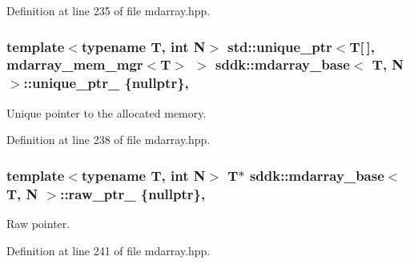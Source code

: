 Definition at line 235 of file mdarray.\+hpp.

\hypertarget{classsddk_1_1mdarray__base_aae4804447519c63f7c1c72d855744dc9}{}
\subsubsection[{unique\+\_\+ptr\+\_\+}]{\setlength{\rightskip}{0pt plus 5cm}template$<$typename T, int N$>$ std\+::unique\+\_\+ptr$<$T\mbox{[}$\,$\mbox{]}, {\bf mdarray\+\_\+mem\+\_\+mgr}$<$T$>$ $>$ {\bf sddk\+::mdarray\+\_\+base}$<$ T, N $>$\+::unique\+\_\+ptr\+\_\+ \{nullptr\}\hspace{0.3cm}{\ttfamily [mutable]}, {\ttfamily [protected]}}\label{classsddk_1_1mdarray__base_aae4804447519c63f7c1c72d855744dc9}


Unique pointer to the allocated memory. 



Definition at line 238 of file mdarray.\+hpp.

\hypertarget{classsddk_1_1mdarray__base_afd65549984a1e8b3b67c64a9c67f1aec}{}
\subsubsection[{raw\+\_\+ptr\+\_\+}]{\setlength{\rightskip}{0pt plus 5cm}template$<$typename T, int N$>$ T$\ast$ {\bf sddk\+::mdarray\+\_\+base}$<$ T, N $>$\+::raw\+\_\+ptr\+\_\+ \{nullptr\}\hspace{0.3cm}{\ttfamily [mutable]}, {\ttfamily [protected]}}\label{classsddk_1_1mdarray__base_afd65549984a1e8b3b67c64a9c67f1aec}


Raw pointer. 



Definition at line 241 of file mdarray.\+hpp.

\hypertarget{classsddk_1_1mdarray__base_a956a63062c0919ace1afb44f6ed60e0c}{}
